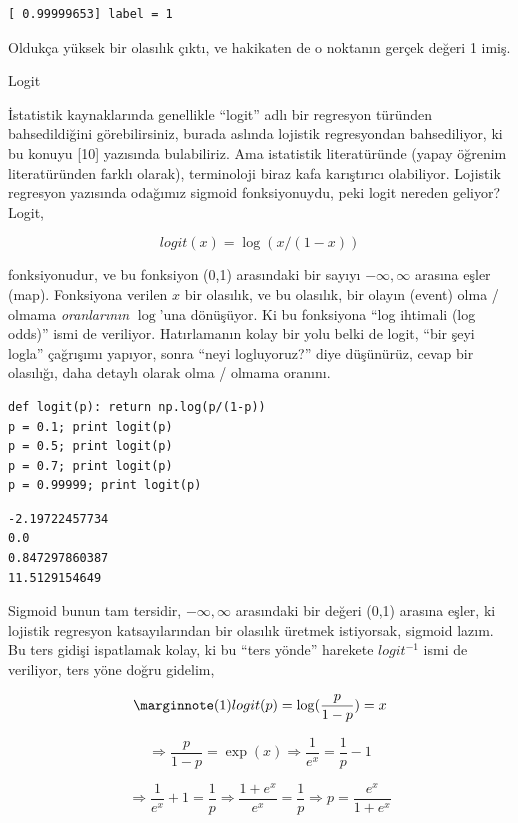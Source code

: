 \documentclass[12pt,fleqn]{article}\usepackage{../../common}
\begin{document}
\begin{verbatim}
[ 0.99999653] label = 1
\end{verbatim}

Oldukça yüksek bir olasılık çıktı, ve hakikaten de o noktanın gerçek değeri 1
imiş.

Logit

İstatistik kaynaklarında genellikle ``logit'' adlı bir regresyon türünden
bahsedildiğini görebilirsiniz, burada aslında lojistik regresyondan
bahsediliyor, ki bu konuyu [10] yazısında bulabiliriz. Ama istatistik
literatüründe (yapay öğrenim literatüründen farklı olarak), terminoloji
biraz kafa karıştırıcı olabiliyor. Lojistik regresyon yazısında odağımız
sigmoid fonksiyonuydu, peki logit nereden geliyor?  Logit,

$$ logit(x) = \log ( x/(1-x) ) $$

fonksiyonudur, ve bu fonksiyon (0,1) arasındaki bir sayıyı $-\infty,\infty$
arasına eşler (map). Fonksiyona verilen $x$ bir olasılık, ve bu olasılık, bir
olayın (event) olma / olmama {\em oranlarının} $\log$'una dönüşüyor. Ki bu
fonksiyona ``log ihtimali (log odds)'' ismi de veriliyor. Hatırlamanın kolay bir
yolu belki de logit, ``bir şeyi logla'' çağrışımı yapıyor, sonra ``neyi
logluyoruz?'' diye düşünürüz, cevap bir olasılığı, daha detaylı olarak olma /
olmama oranını.

\begin{verbatim}
def logit(p): return np.log(p/(1-p))
p = 0.1; print logit(p)
p = 0.5; print logit(p)
p = 0.7; print logit(p)
p = 0.99999; print logit(p)
\end{verbatim}

\begin{verbatim}
-2.19722457734
0.0
0.847297860387
11.5129154649
\end{verbatim}

Sigmoid bunun tam tersidir, $-\infty,\infty$ arasındaki bir değeri (0,1) arasına
eşler, ki lojistik regresyon katsayılarından bir olasılık üretmek istiyorsak,
sigmoid lazım. Bu ters gidişi ispatlamak kolay, ki bu ``ters yönde'' harekete
$logit^{-1}$ ismi de veriliyor, ters yöne doğru gidelim,

$$ 
\mlabel{1}
logit(p) = \log ( \frac{p}{1-p} ) = x
$$

$$ 
\Rightarrow  \frac{p}{1-p} = \exp(x) 
\Rightarrow \frac{1}{e^x} = \frac{1}{p}-1
$$

$$ 
\Rightarrow \frac{1}{e^x} + 1 = \frac{1}{p}
\Rightarrow \frac{1+e^x}{e^x} =  \frac{1}{p}
\Rightarrow p = \frac{e^x}{1+e^x}
 $$
\end{document}
